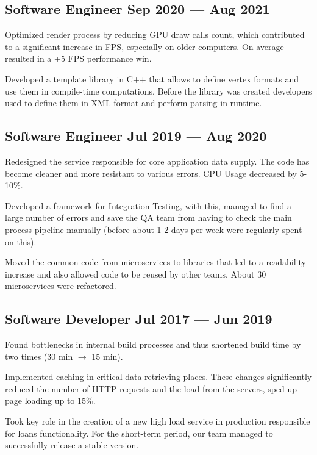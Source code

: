 \documentclass[letter,10pt]{article}
\begin{document}
\subsection{{Software Engineer \hfill Sep 2020 --- Aug 2021}}
\begin{zitemize}
\item Optimized render process by reducing GPU draw calls count, which contributed to a significant increase in FPS, especially on older computers. On average resulted in a +5 FPS performance win.
\item Developed a template library in C++ that allows to define vertex formats and use them in compile-time computations. Before the library was created developers used to define them in XML format and perform parsing in runtime.
\end{zitemize}

\subsection{{Software Engineer \hfill Jul 2019 --- Aug 2020}}
\begin{zitemize}
\item Redesigned the service responsible for core application data supply. The code has become cleaner and more resistant to various errors. CPU Usage decreased by 5-10\%.
\item Developed a framework for Integration Testing, with this, managed to find a large number of errors and save the QA team from having to check the main process pipeline manually (before about 1-2 days per week were regularly spent on this).
\item Moved the common code from microservices to libraries that led to a readability increase and also allowed code to be reused by other teams. About 30 microservices were refactored.
\end{zitemize}

\subsection{{Software Developer \hfill Jul 2017 --- Jun 2019}}
\begin{zitemize}
\item Found bottlenecks in internal build processes and thus shortened build time by two times (30 min $\rightarrow$ 15 min).
\item Implemented caching in critical data retrieving places. These changes significantly reduced the number of HTTP requests and the load from the servers, sped up page loading up to 15\%.
\item Took key role in the creation of a new high load service in production responsible for loans functionality. For the short-term period, our team managed to successfully release a stable version.
\end{zitemize}
\end{document}
